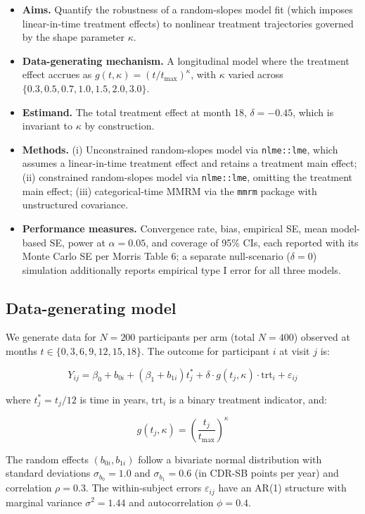 \documentclass[
  11pt,
]{article}
\providecommand{\tightlist}{%
  \setlength{\itemsep}{0pt}\setlength{\parskip}{0pt}}
\begin{document}
\begin{itemize}
\tightlist
\item
  \textbf{Aims.} Quantify the robustness of a random-slopes model fit
  (which imposes linear-in-time treatment effects) to nonlinear
  treatment trajectories governed by the shape parameter \(\kappa\).
\item
  \textbf{Data-generating mechanism.} A longitudinal model where the
  treatment effect accrues as \(g(t, \kappa) = (t / t_{\max})^\kappa\),
  with \(\kappa\) varied across \(\{0.3, 0.5, 0.7, 1.0, 1.5, 2.0, 3.0\}\).
\item
  \textbf{Estimand.} The total treatment effect at month 18,
  \(\delta = -0.45\), which is invariant to \(\kappa\) by construction.
\item
  \textbf{Methods.} (i) Unconstrained random-slopes model via
  \texttt{nlme::lme}, which assumes a linear-in-time treatment
  effect and retains a treatment main effect; (ii) constrained
  random-slopes model via \texttt{nlme::lme}, omitting the
  treatment main effect; (iii) categorical-time MMRM via the
  \texttt{mmrm} package with unstructured covariance.
\item
  \textbf{Performance measures.} Convergence rate, bias, empirical SE,
  mean model-based SE, power at \(\alpha = 0.05\), and coverage of 95\%
  CIs, each reported with its Monte Carlo SE per Morris Table 6; a
  separate null-scenario (\(\delta = 0\)) simulation additionally
  reports empirical type I error for all three models.
\end{itemize}

\subsection{Data-generating model}\label{data-generating-model}

We generate data for \(N = 200\) participants per arm (total
\(N = 400\)) observed at months \(t \in \{0, 3, 6, 9, 12,
15, 18\}\). The outcome for participant \(i\) at visit \(j\) is:

\[
Y_{ij} = \beta_0 + b_{0i} + (\beta_1 + b_{1i}) t_j^* +
\delta \cdot g(t_j, \kappa) \cdot \text{trt}_i +
\varepsilon_{ij}
\]

where \(t_j^* = t_j / 12\) is time in years, \(\text{trt}_i\)
is a binary treatment indicator, and:

\[
g(t_j, \kappa) = \left(\frac{t_j}{t_{\max}}\right)^\kappa
\]

The random effects \((b_{0i}, b_{1i})\) follow a bivariate
normal distribution with standard deviations \(\sigma_{b_0}
= 1.0\) and \(\sigma_{b_1} = 0.6\) (in CDR-SB points per
year) and correlation \(\rho = 0.3\). The within-subject
errors \(\varepsilon_{ij}\) have an AR(1) structure with
marginal variance \(\sigma^2 = 1.44\) and autocorrelation
\(\phi = 0.4\).
\end{document}
